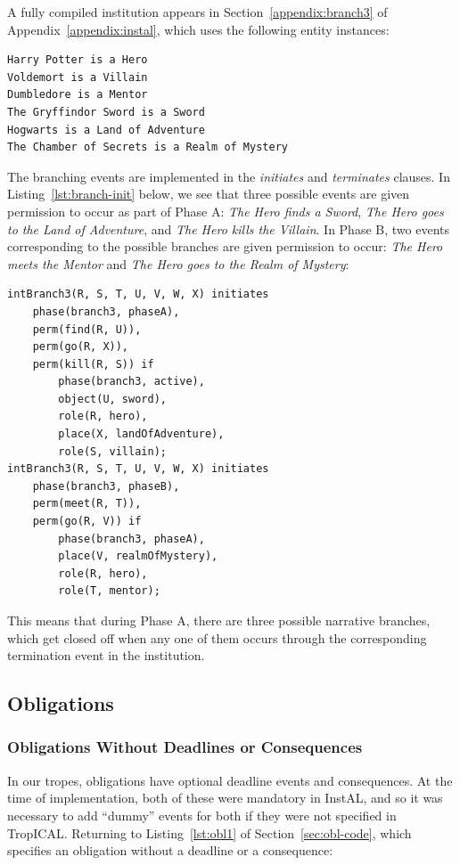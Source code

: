\documentclass[11pt]{report}
\begin{document}
A fully compiled institution appears in Section~\ref{appendix:branch3} of
Appendix~\ref{appendix:instal}, which uses the following entity instances:

\begin{lstlisting}
Harry Potter is a Hero
Voldemort is a Villain
Dumbledore is a Mentor
The Gryffindor Sword is a Sword
Hogwarts is a Land of Adventure
The Chamber of Secrets is a Realm of Mystery
\end{lstlisting}

The branching events are implemented in the \emph{initiates} and
\emph{terminates} clauses. In Listing~\ref{lst:branch-init} below, we see that three possible events are given
permission to occur as part of Phase A: \emph{The Hero finds a Sword}, \emph{The
  Hero goes to the Land of Adventure}, and \emph{The Hero kills the Villain}. In
Phase B, two events corresponding to the possible branches are given permission
to occur: \emph{The Hero meets the Mentor} and \emph{The Hero goes to the Realm
  of Mystery}:

\begin{lstlisting}[label={lst:branch-init}, caption={Initiation events for the
branching trope in Listing~\ref{lst:branch3}}]
intBranch3(R, S, T, U, V, W, X) initiates
    phase(branch3, phaseA),
    perm(find(R, U)),
    perm(go(R, X)),
    perm(kill(R, S)) if
        phase(branch3, active),
        object(U, sword),
        role(R, hero),
        place(X, landOfAdventure),
        role(S, villain);
intBranch3(R, S, T, U, V, W, X) initiates
    phase(branch3, phaseB),
    perm(meet(R, T)),
    perm(go(R, V)) if
        phase(branch3, phaseA),
        place(V, realmOfMystery),
        role(R, hero),
        role(T, mentor);
\end{lstlisting}

This means that during Phase A, there are three possible narrative branches,
which get closed off when any one of them occurs through the corresponding
termination event in the institution.

\subsection{Obligations}
\label{sec:instal-obl}

\subsubsection{Obligations Without Deadlines or Consequences}
In our tropes, obligations have optional deadline events and consequences. At
the time of implementation, both of these were mandatory in InstAL, and so it
was necessary to add ``dummy'' events for both if they were not specified in TropICAL.
Returning to Listing~\ref{lst:obl1} of Section~\ref{sec:obl-code}, which
specifies an obligation without a deadline or a consequence:
\end{document}
